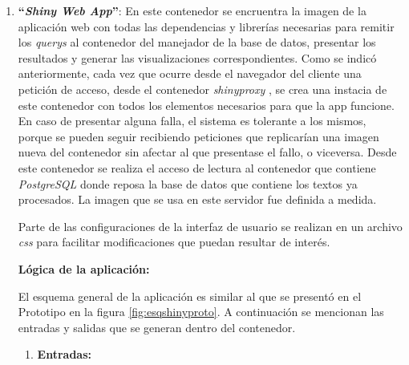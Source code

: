 \documentclass[
  12pt,
  openany]{book}
\begin{document}
\begin{enumerate}
\item
  \textbf{``\emph{Shiny Web App}''}: En este contenedor se encruentra la imagen de la aplicación web con todas las dependencias y librerías necesarias para remitir los \emph{querys} al contenedor del manejador de la base de datos, presentar los resultados y generar las visualizaciones correspondientes. Como se indicó anteriormente, cada vez que ocurre desde el navegador del cliente una petición de acceso, desde el contenedor \emph{shinyproxy} , se crea una instacia de este contenedor con todos los elementos necesarios para que la app funcione. En caso de presentar alguna falla, el sistema es tolerante a los mismos, porque se pueden seguir recibiendo peticiones que replicarían una imagen nueva del contenedor sin afectar al que presentase el fallo, o viceversa. Desde este contenedor se realiza el acceso de lectura al contenedor que contiene \emph{PostgreSQL} donde reposa la base de datos que contiene los textos ya procesados. La imagen que se usa en este servidor fue definida a medida.

  Parte de las configuraciones de la interfaz de usuario se realizan en un archivo \emph{css} para facilitar modificaciones que puedan resultar de interés.

  \textbf{Lógica de la aplicación:}

  El esquema general de la aplicación es similar al que se presentó en el Prototipo en la figura \ref{fig:esqshinyproto}. A continuación se mencionan las entradas y salidas que se generan dentro del contenedor.

  \begin{enumerate}
  \def\labelenumii{\arabic{enumii}.}
  \item
    \textbf{Entradas:}


\end{enumerate}
\end{enumerate}
\end{document}
